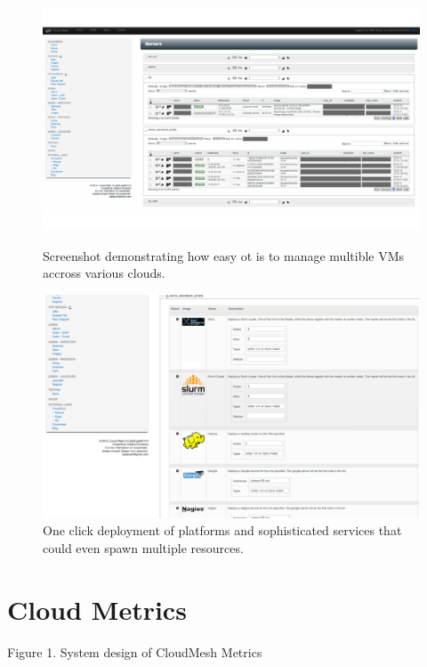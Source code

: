 \documentclass{tex/sig-alternate}
\begin{document}
{\begin{figure}[htb]
  \centering
    \includegraphics[width=1.0\columnwidth]{images/instances.pdf}
  \caption{Screenshot demonstrating how easy ot is to manage multible VMs accross various clouds.}\label{F:instances}
  \centering
    \includegraphics[width=1.0\columnwidth]{images/oneclick.pdf}
  \caption{One click deployment of platforms and sophisticated
    services that could even spawn multiple resources.}\label{F:oneclick}
\end{figure}

\section{Cloud Metrics}


Figure 1. System design of CloudMesh Metrics

}
\end{document}
